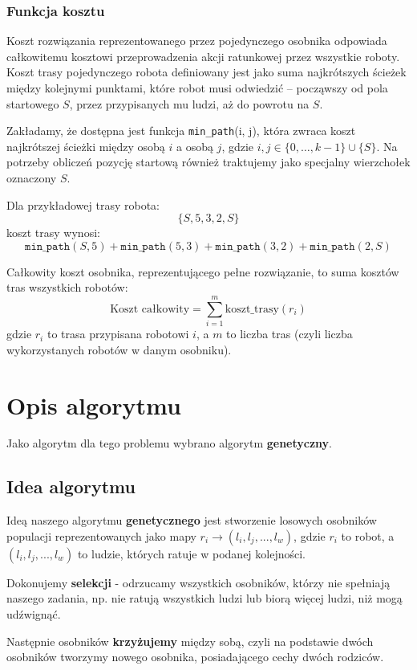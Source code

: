 \documentclass[12pt]{article}
\begin{document}
\subsubsection{Funkcja kosztu}

Koszt rozwiązania reprezentowanego przez pojedynczego osobnika odpowiada całkowitemu kosztowi przeprowadzenia akcji ratunkowej przez wszystkie roboty. Koszt trasy pojedynczego robota definiowany jest jako suma najkrótszych ścieżek między kolejnymi punktami, które robot musi odwiedzić – począwszy od pola startowego \( S \), przez przypisanych mu ludzi, aż do powrotu na \( S \).

Zakładamy, że dostępna jest funkcja \texttt{min\_path}(i, j), która zwraca koszt najkrótszej ścieżki między osobą \( i \) a osobą \( j \), gdzie \( i, j \in \{0, \dots, k-1\} \cup \{S\} \). Na potrzeby obliczeń pozycję startową również traktujemy jako specjalny wierzchołek oznaczony \( S \).

Dla przykładowej trasy robota:
\[
\{S, 5, 3, 2, S\}
\]
koszt trasy wynosi:
\[
\texttt{min\_path}(S, 5) + \texttt{min\_path}(5, 3) + \texttt{min\_path}(3, 2) + \texttt{min\_path}(2, S)
\]

Całkowity koszt osobnika, reprezentującego pełne rozwiązanie, to suma kosztów tras wszystkich robotów:
\[
\text{Koszt całkowity} = \sum_{i=1}^{m} \text{koszt\_trasy}(r_i)
\]
gdzie \( r_i \) to trasa przypisana robotowi \( i \), a \( m \) to liczba tras (czyli liczba wykorzystanych robotów w danym osobniku).


\section{Opis algorytmu}
Jako algorytm dla tego problemu wybrano algorytm \textbf{genetyczny}.

\subsection{Idea algorytmu}
Ideą naszego algorytmu \textbf{genetycznego} jest stworzenie losowych osobników populacji reprezentowanych jako mapy $r_i \rightarrow (l_i,l_j,...,l_w)$, gdzie $r_i$ to robot, a $(l_i,l_j,...,l_w)$ to ludzie, których ratuje w podanej kolejności.

Dokonujemy \textbf{selekcji} - odrzucamy wszystkich osobników, którzy nie spełniają naszego zadania, np. nie ratują wszystkich ludzi lub biorą więcej ludzi, niż mogą udźwignąć.

Następnie osobników \textbf{krzyżujemy} między sobą, czyli na podstawie dwóch osobników tworzymy nowego osobnika, posiadającego cechy dwóch rodziców. 
\end{document}

